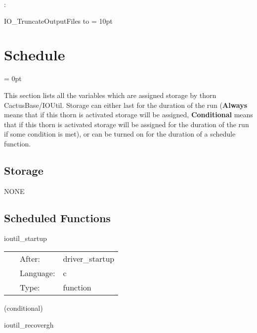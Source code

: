 \documentclass{article}
\begin{document}
: 



IO\_TruncateOutputFiles to 
\vspace{2mm}\parskip = 10pt 

\section{Schedule} 


\parskip = 0pt


\noindent This section lists all the variables which are assigned storage by thorn CactusBase/IOUtil.  Storage can either last for the duration of the run ({\bf Always} means that if this thorn is activated storage will be assigned, {\bf Conditional} means that if this thorn is activated storage will be assigned for the duration of the run if some condition is met), or can be turned on for the duration of a schedule function.


\subsection*{Storage}NONE
\subsection*{Scheduled Functions}
\vspace{5mm}


\hspace{5mm} ioutil\_startup 

\hspace{5mm}{\it startup routine } 


\hspace{5mm}

 \begin{tabular*}{160mm}{cll} 
~ & After:  & driver\_startup \\ 
~ & Language:  & c \\ 
~ & Type:  & function \\ 
\end{tabular*} 


\vspace{5mm}

   (conditional) 

\hspace{5mm} ioutil\_recovergh 

\hspace{5mm}{\it checkpoint recovery routine } 
\end{document}
